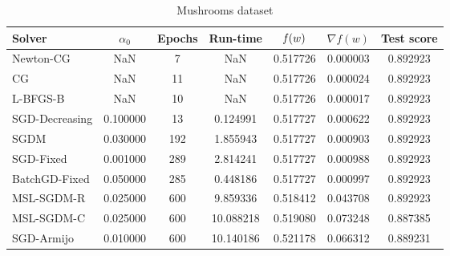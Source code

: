 \begin{table}
\caption{Mushrooms dataset}
\label{tab:mush-tab}
\centering
\begin{tabular}{lS[round-precision=3]S[drop-zero-decimal]S[round-precision=4]S[round-precision=6]S[exponent-mode=scientific]S[round-precision=6]}
\toprule
Solver & {$\alpha_0$} & {Epochs} & {Run-time} & {$\operatorname*{\mathit{f}}(w)$} & {$\nabla f(w)$} & {Test score} \\
\midrule
Newton-CG & NaN & 7 & NaN & 0.517726 & 0.000003 & 0.892923 \\
CG & NaN & 11 & NaN & 0.517726 & 0.000024 & 0.892923 \\
L-BFGS-B & NaN & 10 & NaN & 0.517726 & 0.000017 & 0.892923 \\
SGD-Decreasing & 0.100000 & 13 & 0.124991 & 0.517727 & 0.000622 & 0.892923 \\
SGDM & 0.030000 & 192 & 1.855943 & 0.517727 & 0.000903 & 0.892923 \\
SGD-Fixed & 0.001000 & 289 & 2.814241 & 0.517727 & 0.000988 & 0.892923 \\
BatchGD-Fixed & 0.050000 & 285 & 0.448186 & 0.517727 & 0.000997 & 0.892923 \\
MSL-SGDM-R & 0.025000 & 600 & 9.859336 & 0.518412 & 0.043708 & 0.892923 \\
MSL-SGDM-C & 0.025000 & 600 & 10.088218 & 0.519080 & 0.073248 & 0.887385 \\
SGD-Armijo & 0.010000 & 600 & 10.140186 & 0.521178 & 0.066312 & 0.889231 \\
\bottomrule
\end{tabular}
\end{table}

